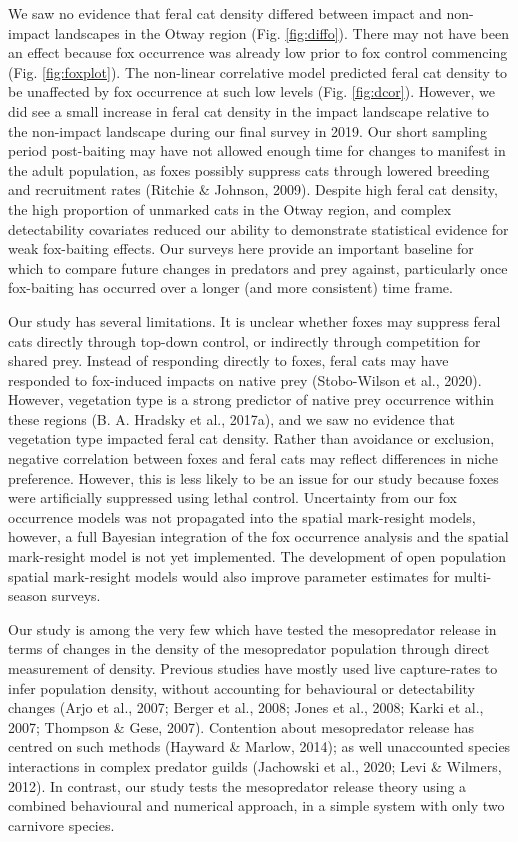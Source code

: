 \documentclass[]{elsarticle} %
\begin{document}
We saw no evidence that feral cat density differed between impact and non-impact landscapes in the Otway region (Fig. \ref{fig:diffo}). There may not have been an effect because fox occurrence was already low prior to fox control commencing (Fig. \ref{fig:foxplot}). The non-linear correlative model predicted feral cat density to be unaffected by fox occurrence at such low levels (Fig. \ref{fig:dcor}). However, we did see a small increase in feral cat density in the impact landscape relative to the non-impact landscape during our final survey in 2019. Our short sampling period post-baiting may have not allowed enough time for changes to manifest in the adult population, as foxes possibly suppress cats through lowered breeding and recruitment rates (Ritchie \& Johnson, 2009). Despite high feral cat density, the high proportion of unmarked cats in the Otway region, and complex detectability covariates reduced our ability to demonstrate statistical evidence for weak fox-baiting effects. Our surveys here provide an important baseline for which to compare future changes in predators and prey against, particularly once fox-baiting has occurred over a longer (and more consistent) time frame.

Our study has several limitations. It is unclear whether foxes may suppress feral cats directly through top-down control, or indirectly through competition for shared prey. Instead of responding directly to foxes, feral cats may have responded to fox-induced impacts on native prey (Stobo-Wilson et al., 2020). However, vegetation type is a strong predictor of native prey occurrence within these regions (B. A. Hradsky et al., 2017a), and we saw no evidence that vegetation type impacted feral cat density. Rather than avoidance or exclusion, negative correlation between foxes and feral cats may reflect differences in niche preference. However, this is less likely to be an issue for our study because foxes were artificially suppressed using lethal control. Uncertainty from our fox occurrence models was not propagated into the spatial mark-resight models, however, a full Bayesian integration of the fox occurrence analysis and the spatial mark-resight model is not yet implemented. The development of open population spatial mark-resight models would also improve parameter estimates for multi-season surveys.

Our study is among the very few which have tested the mesopredator release in terms of changes in the density of the mesopredator population through direct measurement of density. Previous studies have mostly used live capture-rates to infer population density, without accounting for behavioural or detectability changes (Arjo et al., 2007; Berger et al., 2008; Jones et al., 2008; Karki et al., 2007; Thompson \& Gese, 2007). Contention about mesopredator release has centred on such methods (Hayward \& Marlow, 2014); as well unaccounted species interactions in complex predator guilds (Jachowski et al., 2020; Levi \& Wilmers, 2012). In contrast, our study tests the mesopredator release theory using a combined behavioural and numerical approach, in a simple system with only two carnivore species.
\end{document}
